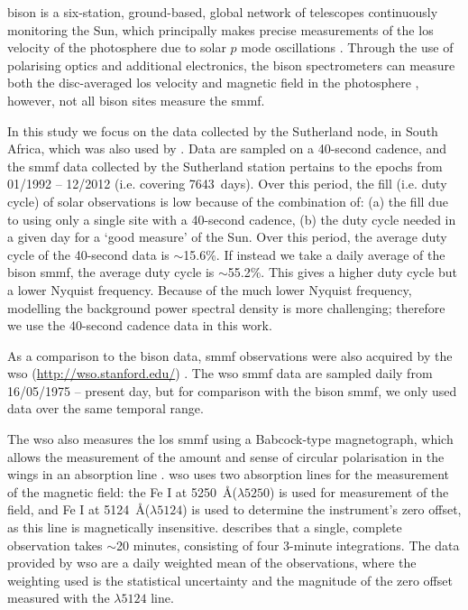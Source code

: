 \gls{bison} is a six-station, ground-based, global network of telescopes continuously monitoring the Sun, which principally makes precise measurements of the \gls{los} velocity of the photosphere due to solar $p$ mode oscillations \citep{hale_performance_2016}. Through the use of polarising optics and additional electronics, the \gls{bison} spectrometers can measure both the disc-averaged \gls{los} velocity and magnetic field in the photosphere \citep{chaplin_studies_2003}, however, not all \gls{bison} sites measure the \gls{smmf}. %

In this study we focus on the data collected by the Sutherland node, in South Africa, which was also used by \cite{chaplin_studies_2003}. Data are sampled on a 40-second cadence, and the \gls{smmf} data collected by the Sutherland station pertains to the epochs from 01/1992 -- 12/2012 (i.e. covering 7643~days). Over this period, the fill (i.e. duty cycle) of solar observations is low because of the combination of: (a) the fill due to using only a single site with a 40-second cadence, (b) the duty cycle needed in a given day for a `good measure' of the Sun. Over this period, the average duty cycle of the 40-second data is $\sim$15.6\%. If instead we take a daily average of the \gls{bison} \gls{smmf}, the average duty cycle is $\sim$55.2\%. This gives a higher duty cycle but a lower Nyquist frequency. Because of the much lower Nyquist frequency, modelling the background power spectral density is more challenging; therefore we use the 40-second cadence data in this work.

As a comparison to the \gls{bison} data, \gls{smmf} observations were also acquired by the \gls{wso} (\url{http://wso.stanford.edu/}) \citep{scherrer_mean_1977-1}. The \gls{wso} \gls{smmf} data are sampled daily from 16/05/1975 -- present day, but for comparison with the \gls{bison} \gls{smmf}, we only used data over the same temporal range.

The \gls{wso} also measures the \gls{los} \gls{smmf} using a Babcock-type magnetograph, which allows the measurement of the amount and sense of circular polarisation in the wings in an absorption line \citep{scherrer_mean_1977}. \gls{wso} uses two absorption lines for the measurement of the magnetic field: the Fe I at 5250~\AA ($\lambda 5250$) is used for measurement of the field, and Fe I at 5124~\AA ($\lambda 5124$) is used to determine the instrument's zero offset, as this line is magnetically insensitive. \cite{scherrer_mean_1977} describes that a single, complete observation takes $\sim$20 minutes, consisting of four 3-minute integrations. The data provided by \gls{wso} are a daily weighted mean of the observations, where the weighting used is the statistical uncertainty and the magnitude of the zero offset measured with the $\lambda 5124$ line.



